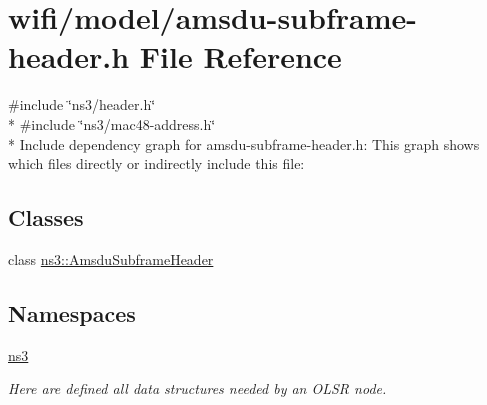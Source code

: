 \hypertarget{amsdu-subframe-header_8h}{}\section{wifi/model/amsdu-\/subframe-\/header.h File Reference}
\label{amsdu-subframe-header_8h}
{\ttfamily \#include \char`\"{}ns3/header.\+h\char`\"{}}\\*
{\ttfamily \#include \char`\"{}ns3/mac48-\/address.\+h\char`\"{}}\\*
Include dependency graph for amsdu-\/subframe-\/header.h\+:
This graph shows which files directly or indirectly include this file\+:
\subsection*{Classes}
\begin{DoxyCompactItemize}
\item 
class \hyperlink{classns3_1_1AmsduSubframeHeader}{ns3\+::\+Amsdu\+Subframe\+Header}
\end{DoxyCompactItemize}
\subsection*{Namespaces}
\begin{DoxyCompactItemize}
\item 
 \hyperlink{namespacens3}{ns3}
\begin{DoxyCompactList}\small\item\em Here are defined all data structures needed by an O\+L\+SR node. \end{DoxyCompactList}\end{DoxyCompactItemize}
